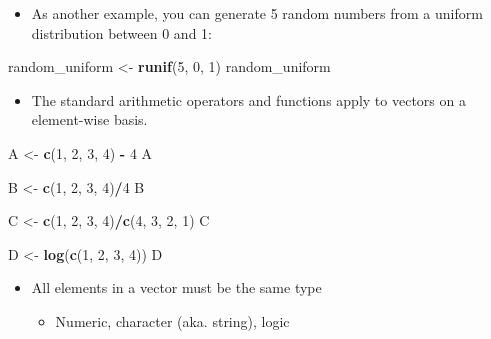 \documentclass[
]{book}
\newenvironment{Shaded}{\begin{snugshade}}{\end{snugshade}}
\newcommand{\DecValTok}[1]{\textcolor[rgb]{0.00,0.00,0.81}{#1}}
\newcommand{\FunctionTok}[1]{\textcolor[rgb]{0.13,0.29,0.53}{\textbf{#1}}}
\newcommand{\NormalTok}[1]{#1}
\newcommand{\OtherTok}[1]{\textcolor[rgb]{0.56,0.35,0.01}{#1}}
\newcommand{\SpecialCharTok}[1]{\textcolor[rgb]{0.81,0.36,0.00}{\textbf{#1}}}
\providecommand{\tightlist}{%
  \setlength{\itemsep}{0pt}\setlength{\parskip}{0pt}}
\begin{document}
\begin{itemize}
\tightlist
\item
  As another example, you can generate 5 random numbers from a uniform distribution between 0 and 1:
\end{itemize}

\begin{Shaded}
\begin{Highlighting}[]
\NormalTok{random\_uniform }\OtherTok{\textless{}{-}} \FunctionTok{runif}\NormalTok{(}\DecValTok{5}\NormalTok{, }\DecValTok{0}\NormalTok{, }\DecValTok{1}\NormalTok{)}
\NormalTok{random\_uniform}
\end{Highlighting}
\end{Shaded}

\begin{itemize}
\tightlist
\item
  The standard arithmetic operators and functions apply to vectors on a element-wise basis.
\end{itemize}

\begin{Shaded}
\begin{Highlighting}[]
\NormalTok{A }\OtherTok{\textless{}{-}} \FunctionTok{c}\NormalTok{(}\DecValTok{1}\NormalTok{, }\DecValTok{2}\NormalTok{, }\DecValTok{3}\NormalTok{, }\DecValTok{4}\NormalTok{) }\SpecialCharTok{{-}} \DecValTok{4}
\NormalTok{A}

\NormalTok{B }\OtherTok{\textless{}{-}} \FunctionTok{c}\NormalTok{(}\DecValTok{1}\NormalTok{, }\DecValTok{2}\NormalTok{, }\DecValTok{3}\NormalTok{, }\DecValTok{4}\NormalTok{)}\SpecialCharTok{/}\DecValTok{4}
\NormalTok{B}

\NormalTok{C }\OtherTok{\textless{}{-}} \FunctionTok{c}\NormalTok{(}\DecValTok{1}\NormalTok{, }\DecValTok{2}\NormalTok{, }\DecValTok{3}\NormalTok{, }\DecValTok{4}\NormalTok{)}\SpecialCharTok{/}\FunctionTok{c}\NormalTok{(}\DecValTok{4}\NormalTok{, }\DecValTok{3}\NormalTok{, }\DecValTok{2}\NormalTok{, }\DecValTok{1}\NormalTok{)}
\NormalTok{C}

\NormalTok{D }\OtherTok{\textless{}{-}} \FunctionTok{log}\NormalTok{(}\FunctionTok{c}\NormalTok{(}\DecValTok{1}\NormalTok{, }\DecValTok{2}\NormalTok{, }\DecValTok{3}\NormalTok{, }\DecValTok{4}\NormalTok{))}
\NormalTok{D}
\end{Highlighting}
\end{Shaded}

\begin{itemize}
\tightlist
\item
  All elements in a vector must be the same type

  \begin{itemize}
  \tightlist
  \item
    Numeric, character (aka. string), logic
  \end{itemize}
\end{itemize}
\end{document}

